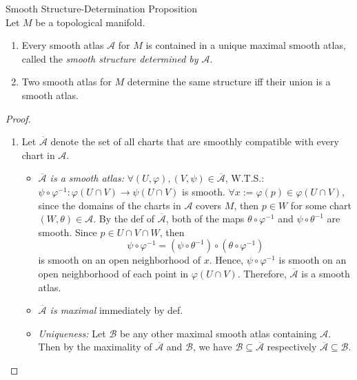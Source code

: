 \begin{proposition}{Smooth Structure-Determination Proposition}\\
Let $M$ be a topological manifold.
\begin{enumerate}
    \item Every smooth atlas $\mathcal{A}$ for $M$ is contained in a unique maximal smooth atlas, called the \textit{smooth structure determined by $\mathcal{A}$}.
    \item Two smooth atlas for $M$ determine the same structure iff their union is a smooth atlas.
\end{enumerate}
\end{proposition}

\begin{proof}
    \begin{enumerate}
        \item Let $\overline{\mathcal{A}}$ denote the set of all charts that are smoothly compatible with every chart in $\mathcal{A}$.
        \begin{itemize}
            \item \textit{$\overline{\mathcal{A}}$ is a smooth atlas:} $\forall (U,\varphi), (V,\psi) \in \overline{\mathcal{A}}$, W.T.S.: $\psi\circ \varphi^{-1}: \varphi(U \cap V) \to \psi(U \cap V)$ is smooth. $\forall x:= \varphi(p) \in \varphi(U \cap V)$, since the domains of the charts in $\mathcal{A}$ covers $M$, then $p\in W$ for some chart $(W,\theta) \in \mathcal{A}$. By the def of $\overline{\mathcal{A}}$, both of the maps $\theta \circ \varphi^{-1}$ and $\psi \circ \theta^{-1}$ are smooth. Since $p\in U\cap V\cap W$, then
            \[
            \psi\circ \varphi^{-1} = (\psi\circ \theta^{-1}) \circ (\theta \circ \varphi^{-1})
            \]
            is smooth on an open neighborhood of $x$. Hence, $\psi \circ \varphi^{-1}$ is smooth on an open neighborhood of each point in $\varphi(U \cap V)$. Therefore, $\overline{\mathcal{A}}$ is a smooth atlas.

            \item \textit{$\overline{\mathcal{A}}$ is maximal} immediately by def.
            \item \textit{Uniqueness:} Let $\mathcal{B}$ be any other maximal smooth atlas containing $\mathcal{A}$. Then by the maximality of $\overline{\mathcal{A}}$ and $\mathcal{B}$, we have $\mathcal{B} \subseteq \overline{\mathcal{A}}$ respectively $\overline{\mathcal{A}} \subseteq \mathcal{B}$.
        \end{itemize}


\end{enumerate}
\end{proof}
